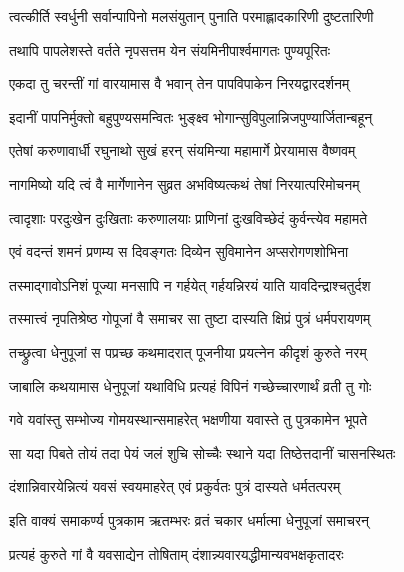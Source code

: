 \twolineshloka
{त्वत्कीर्ति स्वर्धुनी सर्वान्पापिनो मलसंयुतान्}
{पुनाति परमाह्लादकारिणी दुष्टतारिणी}%

\twolineshloka
{तथापि पापलेशस्ते वर्तते नृपसत्तम}
{येन संयमिनीपार्श्वमागतः पुण्यपूरितः}%

\twolineshloka
{एकदा तु चरन्तीं गां वारयामास वै भवान्}
{तेन पापविपाकेन निरयद्वारदर्शनम्}%

\twolineshloka
{इदानीं पापनिर्मुक्तो बहुपुण्यसमन्वितः}
{भुङ्क्ष्व भोगान्सुविपुलान्निजपुण्यार्जितान्बहून्}%

\twolineshloka
{एतेषां करुणावार्धी रघुनाथो सुखं हरन्}
{संयमिन्या महामार्गे प्रेरयामास वैष्णवम्}%

\twolineshloka
{नागमिष्यो यदि त्वं वै मार्गेणानेन सुव्रत}
{अभविष्यत्कथं तेषां निरयात्परिमोचनम्}%

\twolineshloka
{त्वादृशाः परदुःखेन दुःखिताः करुणालयाः}
{प्राणिनां दुःखविच्छेदं कुर्वन्त्येव महामते}%


\twolineshloka
{एवं वदन्तं शमनं प्रणम्य स दिवङ्गतः}
{दिव्येन सुविमानेन अप्सरोगणशोभिना}%

\twolineshloka
{तस्माद्गावोऽनिशं पूज्या मनसापि न गर्हयेत्}
{गर्हयन्निरयं याति यावदिन्द्राश्चतुर्दश}%

\twolineshloka
{तस्मात्त्वं नृपतिश्रेष्ठ गोपूजां वै समाचर}
{सा तुष्टा दास्यति क्षिप्रं पुत्रं धर्मपरायणम्}%


\twolineshloka
{तच्छ्रुत्वा धेनुपूजां स पप्रच्छ कथमादरात्}
{पूजनीया प्रयत्नेन कीदृशं कुरुते नरम्}%

\twolineshloka
{जाबालि कथयामास धेनुपूजां यथाविधि}
{प्रत्यहं विपिनं गच्छेच्चारणार्थं व्रती तु गोः}%

\twolineshloka
{गवे यवांस्तु सम्भोज्य गोमयस्थान्समाहरेत्}
{भक्षणीया यवास्ते तु पुत्रकामेन भूपते}%

\twolineshloka
{सा यदा पिबते तोयं तदा पेयं जलं शुचि}
{सोच्चैः स्थाने यदा तिष्ठेत्तदानीं चासनस्थितः}%

\twolineshloka
{दंशान्निवारयेन्नित्यं यवसं स्वयमाहरेत्}
{एवं प्रकुर्वतः पुत्रं दास्यते धर्मतत्परम्}%


\twolineshloka
{इति वाक्यं समाकर्ण्य पुत्रकाम ऋतम्भरः}
{व्रतं चकार धर्मात्मा धेनुपूजां समाचरन्}%

\twolineshloka
{प्रत्यहं कुरुते गां वै यवसाद्येन तोषिताम्}
{दंशान्न्यवारयद्धीमान्यवभक्षकृतादरः}%

